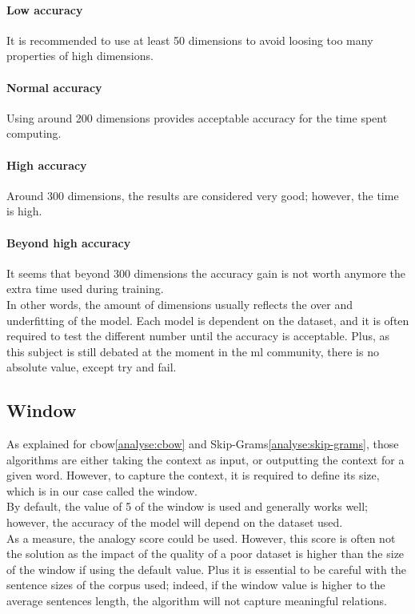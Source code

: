 \paragraph{Low accuracy}
It is recommended to use at least 50 dimensions to avoid loosing too many properties of high dimensions.

\paragraph{Normal accuracy}
Using around 200 dimensions provides acceptable accuracy for the time spent computing.

\paragraph{High accuracy}
Around 300 dimensions, the results are considered very good; however, the time is high.

\paragraph{Beyond high accuracy}
It seems that beyond 300 dimensions the accuracy gain is not worth anymore the extra time used during training.\\

In other words, the amount of dimensions usually reflects the over and underfitting of the model. Each model is dependent on the dataset, and it is often required to test the different number until the accuracy is acceptable. Plus, as this subject is still debated at the moment in the \gls{ml} community, there is no absolute value, except try and fail.


\subsection{Window}
\label{analyse:window}
As explained for \gls{cbow}\ref{analyse:cbow} and Skip-Grams\ref{analyse:skip-grams}, those algorithms are either taking the context as input, or outputting the context for a given word. However, to capture the context, it is required to define its size, which is in our case called the window.\\

By default, the value of  5 of the window is used and generally works well; however, the accuracy of the model will depend on the dataset used.\\

As a measure, the analogy score could be used. However, this score is often not the solution as the impact of the quality of a poor dataset is higher than the size of the window if using the default value. Plus it is essential to be careful with the sentence sizes of the corpus used; indeed, if the window value is higher to the average sentences length, the algorithm will not capture meaningful relations. \\

